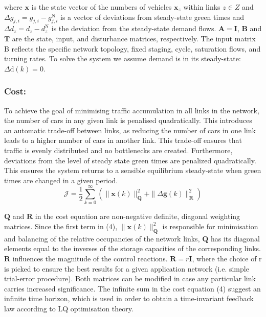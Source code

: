 \documentclass[11pt]{article}
\begin{document}
where $ \mathbf{x} $ is the state vector of the numbers of vehicles $ \mathbf{x}_z$ within links $z \in Z$ and $\Delta g_{j, i}=g_{j, i}-g_{j, i}^{\mathrm{N}}$ is a vector of deviations from steady-state green times and $\Delta d_{z}=d_{z}-d_{z}^{\mathrm{N}}$ is the deviation from the steady-state demand flows. $\mathbf{A}= \mathbf{I}$, $\mathbf{B}$ and  $\mathbf{T}$ are the state, input, and disturbance matrices, respectively. The input matrix B reflects the specific network topology, fixed staging, cycle, saturation flows, and turning rates. To solve the system we assume demand is in its steady-state: $\Delta \mathrm{d}(k)=0$.

\subsubsection*{Cost:}
To achieve the goal of minimising traffic accumulation in all links in the network, the number of cars in any given link is penalised quadratically. This introduces an automatic trade-off between links, as reducing the number of cars in one link leads to a higher number of cars in another link. This trade-off ensures that traffic is evenly distributed and no bottlenecks are created. Furthermore, deviations from the level of steady state green times are penalized quadratically. This ensures the system returns to a sensible equilibrium steady-state when green times are changed in a given period.
\begin{equation}
\mathcal{J}=\frac{1}{2} \sum_{k=0}^{\infty}\left(\|\mathbf{x}(k)\|_{\mathbf{Q}}^{2}+\|\Delta \mathbf{g}(k)\|_{\mathbf{R}}^{2}\right)
\end{equation}

$\mathbf{Q}$ and $\mathbf{R}$ in the cost equation are non-negative definite, diagonal weighting matrices. Since the first term in (4), $\|\mathbf{x}(k)\|_{\mathbf{Q}}^{2}$ is responsible for minimisation and balancing of the relative occupancies of the network links, $\mathbf{Q}$ has its diagonal elements equal to the inverses of the storage capacities of the corresponding links. $\mathbf{R}$ influences the magnitude of the control reactions.  $\mathbf{R}=r\mathbf{I}$, where the choice of r is picked to ensure the best results for a given application network (i.e. simple trial-error procedure). Both matrices can be modified in case any particular link carries increased significance. The infinite sum in the cost equation (4) suggest an infinite time horizon, which is used in order to obtain a time-invariant feedback law according to LQ optimisation theory. 
\end{document}
